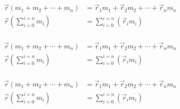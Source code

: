 \begin{align*}
\vec{r} \left( m_1 + m_2 + \cdots + m_n \right) &= \vec{r}_1m_1 + \vec{r}_2m_2 + \cdots + \vec{r}_nm_n\\[4mm]
\vec{r}\left(\sum_{i=0}^{i=n} m_i\right)  &= \sum_{i=0}^{i=n} (\vec{r}_i m_i )\\[5mm]
\end{align*}


\begin{align*}
\vec{r} \left( m_1 + m_2 + \cdots + m_n \right) &= \vec{r}_1m_1 + \vec{r}_2m_2 + \cdots + \vec{r}_nm_n\\[4mm]
\vec{r}\left(\sum_{i=0}^{i=n} m_i\right)  &= \sum_{i=0}^{i=n} (\vec{r}_i m_i )\\[5mm]
\end{align*}

\begin{align*}
\vec{r} \left( m_1 + m_2 + \cdots + m_n \right) &= \vec{r}_1m_1 + \vec{r}_2m_2 + \cdots + \vec{r}_nm_n\\[4mm]
\vec{r}\left(\sum_{i=0}^{i=n} m_i\right)  &= \sum_{i=0}^{i=n} (\vec{r}_i m_i )\\[5mm]
\end{align*}


